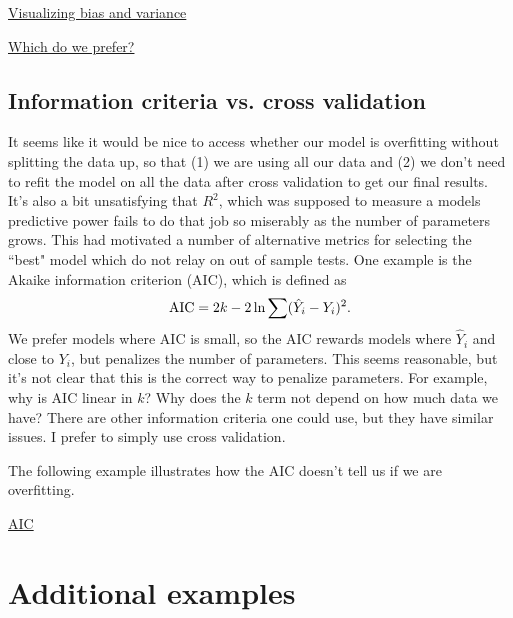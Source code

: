 \begin{example}
\href{https://colab.research.google.com/drive/1euwp8RjQ-fNru49tcTqVWYlqp2swGO4Y#scrollTo=q0n6Iel0auii&line=4&uniqifier=1}{Visualizing bias and variance}
\end{example}

\begin{example}
\href{https://colab.research.google.com/drive/1euwp8RjQ-fNru49tcTqVWYlqp2swGO4Y#scrollTo=myEKGetym6MD&line=1&uniqifier=1}{Which do we prefer?}
\end{example}



\subsection{Information criteria vs. cross validation}
It seems like it would be nice to access whether our model is overfitting without splitting the data up, so that (1) we are using all our data and (2) we don't need to refit the model on all the data after cross validation to get our final results. It's also a bit unsatisfying that $R^2$, which was supposed to measure a models predictive power fails to do that job so miserably as the number of parameters grows. This had motivated a number of alternative metrics for selecting the ``best" model which do not relay on out of sample tests. One example is the Akaike information criterion (AIC), which is defined as 
\begin{equation}
{\rm AIC} = 2k - 2\ln \sum (\hat{Y}_i - Y_i)^2.
\end{equation}
We prefer models where AIC is small, so the AIC rewards models where $\hat{Y}_i$ and close to $Y_i$, but penalizes the number of parameters. This seems reasonable, but it's not clear that this is the correct way to penalize parameters. For example, why is AIC linear in $k$? Why does the $k$ term not depend on how much data we have? There are other information criteria one could use, but they have similar issues. I prefer to simply use cross validation. 

The following example illustrates how the AIC doesn't tell us if we are overfitting. 
\begin{example}
\href{https://colab.research.google.com/drive/1euwp8RjQ-fNru49tcTqVWYlqp2swGO4Y#scrollTo=myEKGetym6MD&line=1&uniqifier=1}{AIC}
\end{example}

\section{Additional examples}

